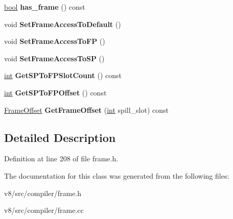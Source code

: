 \begin{DoxyCompactItemize}
\mbox{\label{classv8_1_1internal_1_1compiler_1_1FrameAccessState_a8cc7d278e56b469b2e6b90347b31e513}} 
\mbox{\hyperlink{classbool}{bool}} {\bfseries has\+\_\+frame} () const
\item 
\mbox{\label{classv8_1_1internal_1_1compiler_1_1FrameAccessState_a001a59fa5264c0b6258ce73ec9839a30}} 
void {\bfseries Set\+Frame\+Access\+To\+Default} ()
\item 
\mbox{\label{classv8_1_1internal_1_1compiler_1_1FrameAccessState_a41f291198c791ef4579c8fd4f2864274}} 
void {\bfseries Set\+Frame\+Access\+To\+FP} ()
\item 
\mbox{\label{classv8_1_1internal_1_1compiler_1_1FrameAccessState_a19d517b0eb62cd2610c9eb5f54fc3039}} 
void {\bfseries Set\+Frame\+Access\+To\+SP} ()
\item 
\mbox{\label{classv8_1_1internal_1_1compiler_1_1FrameAccessState_af073e6fd8491d818b41e2ad6800a0adc}} 
\mbox{\hyperlink{classint}{int}} {\bfseries Get\+S\+P\+To\+F\+P\+Slot\+Count} () const
\item 
\mbox{\label{classv8_1_1internal_1_1compiler_1_1FrameAccessState_a573204b158788be8534d5e6316a6ccb9}} 
\mbox{\hyperlink{classint}{int}} {\bfseries Get\+S\+P\+To\+F\+P\+Offset} () const
\item 
\mbox{\label{classv8_1_1internal_1_1compiler_1_1FrameAccessState_a49b85ebf55fcffbfa8b6c3ded03d0dc0}} 
\mbox{\hyperlink{classv8_1_1internal_1_1compiler_1_1FrameOffset}{Frame\+Offset}} {\bfseries Get\+Frame\+Offset} (\mbox{\hyperlink{classint}{int}} spill\+\_\+slot) const
\end{DoxyCompactItemize}


\subsection{Detailed Description}


Definition at line 208 of file frame.\+h.



The documentation for this class was generated from the following files\+:\begin{DoxyCompactItemize}
\item 
v8/src/compiler/frame.\+h\item 
v8/src/compiler/frame.\+cc\end{DoxyCompactItemize}
